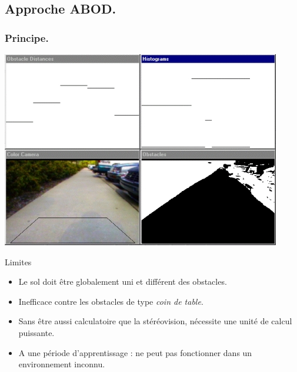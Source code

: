 \subsection[ABOD]{Approche ABOD.}
\begin{frame}
    \frametitle{Principe.}
     {
        \begin{center}
            \includegraphics[width=0.8\linewidth]{rcs/abod.png}
        \end{center}
    }
     {
        \begin{alertblock}{Limites}
            \begin{itemize}
                \pause \item Le sol doit être globalement uni et différent des obstacles.
                \pause \item Inefficace contre les obstacles de type \emph{coin de table}.
                \pause \item Sans être aussi calculatoire que la stéréovision, nécessite une unité de calcul puissante.
                \pause \item A une période d'apprentissage : ne peut pas fonctionner dans un environnement inconnu.
            \end{itemize}
        \end{alertblock}
    }
\end{frame}


